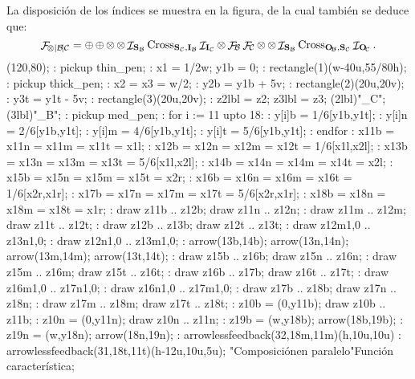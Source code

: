 La disposición de los índices se muestra en la figura, de la cual
también se deduce que:
 $$ \F_{\prl\!|B\!|C} = \srl \srl
    \prl \prl \ID_{\st B} \op{Cross}_{\st C,\inp B} \ID_{\inp C}
    \prl \F_B \F_C
    \prl \prl \ID_{\st B} \op{Cross}_{\out B,\st C} \ID_{\out C} .$$
\MTbeginfigure(120,80);
 \MT: pickup thin_pen;
 \MT: x1 = 1/2w; y1b = 0;
 \MT: rectangle(1)(w-40u,55/80h); %
 \MT: pickup thick_pen;
 \MT: x2 = x3 = w/2;
 \MT: y2b = y1b + 5v;
 \MT: rectangle(2)(20u,20v); %
 \MT: y3t = y1t - 5v;
 \MT: rectangle(3)(20u,20v); %
 \MT: z2lbl = z2; z3lbl = z3;
 \MTlabel(2lbl)"\F_C";
 \MTlabel(3lbl)"\F_B";
 \MT: pickup med_pen;
 \MT: for i := 11 upto 18:
 \MT:  y[i]b = 1/6[y1b,y1t];
 \MT:  y[i]n = 2/6[y1b,y1t];
 \MT:  y[i]m = 4/6[y1b,y1t];
 \MT:  y[i]t = 5/6[y1b,y1t];
 \MT: endfor
 \MT: x11b = x11n = x11m = x11t = x1l;
 \MT: x12b = x12n = x12m = x12t = 1/6[x1l,x2l];
 \MT: x13b = x13n = x13m = x13t = 5/6[x1l,x2l];
 \MT: x14b = x14n = x14m = x14t = x2l;
 \MT: x15b = x15n = x15m = x15t = x2r;
 \MT: x16b = x16n = x16m = x16t = 1/6[x2r,x1r];
 \MT: x17b = x17n = x17m = x17t = 5/6[x2r,x1r];
 \MT: x18b = x18n = x18m = x18t = x1r;
 \MT: draw z11b .. z12b; draw z11n .. z12n;
 \MT: draw z11m .. z12m; draw z11t .. z12t;
 \MT: draw z12b .. z13b; draw z12t .. z13t;
 \MT: draw z12m{1,0} .. z13n{1,0};
 \MT: draw z12n{1,0} .. z13m{1,0};
 \MT: arrow(13b,14b); arrow(13n,14n); arrow(13m,14m); arrow(13t,14t);
 \MT: draw z15b .. z16b; draw z15n .. z16n;
 \MT: draw z15m .. z16m; draw z15t .. z16t;
 \MT: draw z16b .. z17b; draw z16t .. z17t;
 \MT: draw z16m{1,0} .. z17n{1,0};
 \MT: draw z16n{1,0} .. z17m{1,0};
 \MT: draw z17b .. z18b; draw z17n .. z18n;
 \MT: draw z17m .. z18m; draw z17t .. z18t;
 \MT: z10b = (0,y11b); draw z10b .. z11b;
 \MT: z10n = (0,y11n); draw z10n .. z11n;
 \MT: z19b = (w,y18b); arrow(18b,19b);
 \MT: z19n = (w,y18n); arrow(18n,19n);
 \MT: arrowlessfeedback(32,18m,11m)(h,10u,10u)
 \MT: arrowlessfeedback(31,18t,11t)(h-12u,10u,5u);
\MTendfigure"Composición\cr en paralelo"Función característica;

